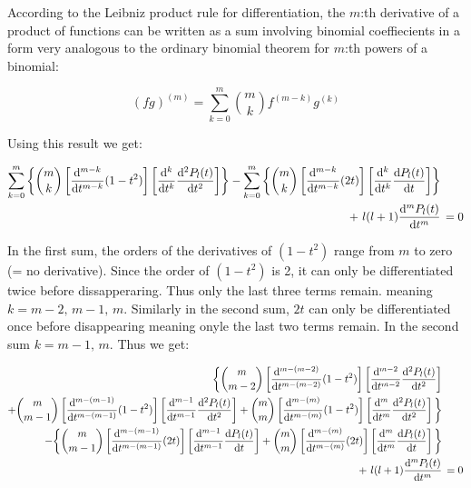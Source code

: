 \documentclass{article}
\begin{document}
    According to the Leibniz product rule for differentiation, the $m$:th derivative of a product of functions can be written as a sum involving binomial coeffiecients in a form
    very analogous to the ordinary binomial theorem for $m$:th powers of a binomial:

    \begin{equation}
        (fg)^{(m)} = \sum_{k = 0}^{m}\binom{m}{k}f^{(m - k)}g^{(k)}
    \end{equation}

    Using this result we get:

    \begin{equation}
        \begin{aligned}
            \sum_{k = 0}^{m}\left\{\binom{m}{k}\left[\odv[order = m-k]{}{t}(1 - t^2)\right]\left[\odv[order = k]{}{t}\odv[order = 2]{P_l(t)}{t}\right]\right\}
            - \sum_{k = 0}^{m}\left\{\binom{m}{k}\left[\odv[order = m-k]{}{t}(2t)\right]\left[\odv[order = k]{}{t}\odv{P_l(t)}{t} \right]\right\}& \\
            + \ l(l+1)\odv[order = m]{P_l(t)}{t} &\, = 0
        \end{aligned}
    \end{equation}

    In the first sum, the orders of the derivatives of $(1 - t^2)$ range from $m$ to zero (= no derivative). Since the order of $(1 - t^2)$ is 2, it can only be differentiated
    twice before dissapperaring. Thus only the last three terms remain. meaning $k = m - 2,\, m - 1,\, m$. Similarly in the second sum, $2t$ can only be differentiated once before
    disappearing meaning onyle the last two terms remain. In the second sum $k = m - 1,\, m$. Thus we get:

    \begin{equation}
        \begin{aligned}
            \bigg\{\binom{m}{m - 2}\left[\odv[order = m - (m - 2)]{}{t}(1 - t^2)\right]\left[\odv[order = m - 2]{}{t}\odv[order = 2]{P_l(t)}{t}\right]& \\
                + \binom{m}{m - 1}\left[\odv[order = m - (m - 1)]{}{t}(1 - t^2)\right]\left[\odv[order = m - 1]{}{t}\odv[order = 2]{P_l(t)}{t}\right]
            + \binom{m}{m}\left[\odv[order = m - (m)]{}{t}(1 - t^2)\right]\left[\odv[order = m]{}{t}\odv[order = 2]{P_l(t)}{t}\right]\bigg\}& \\
            - \bigg\{\binom{m}{m - 1}\left[\odv[order = m - (m - 1)]{}{t}(2t)\right]\left[\odv[order = m - 1]{}{t}\odv{P_l(t)}{t} \right]
            + \binom{m}{m}\left[\odv[order = m - (m)]{}{t}(2t)\right]\left[\odv[order = m]{}{t}\odv{P_l(t)}{t} \right]\bigg\}& \\ 
            + \ l(l+1)\odv[order = m]{P_l(t)}{t} &\, = 0
        \end{aligned}
    \end{equation}
\end{document}
